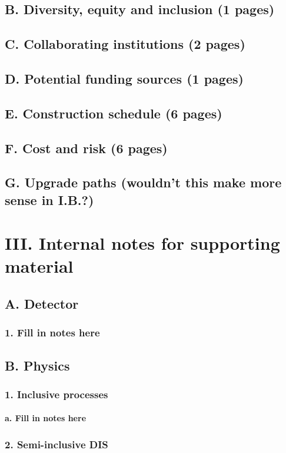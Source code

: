 \documentclass{report}
\begin{document}
\section{B. Diversity, equity and inclusion (1 pages)}
\section{C. Collaborating institutions (2 pages)}
\section{D. Potential funding sources (1 pages)}
\section{E. Construction schedule (6 pages)}
\section{F. Cost and risk (6 pages)}
\section{G. Upgrade paths (wouldn’t this make more sense in I.B.?)}
%
\chapter{III. Internal notes for supporting material}
%
\section{A. Detector}
\subsection{1. Fill in notes here}
%
\section{B. Physics}
\subsection{1. Inclusive processes}
\subsubsection{a. Fill in notes here}
\subsection{2. Semi-inclusive DIS}
\end{document}
